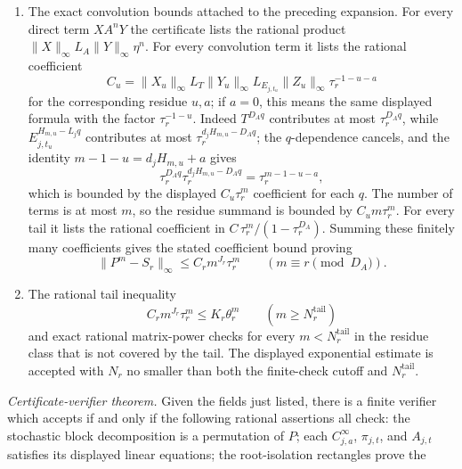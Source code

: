 \begin{theorem}
\begin{enumerate}[label=\textup{(\roman*)}]
    \(H_{m,u}-L_jq\ge1\); the finitely many smaller recurrent exponents
    are moved to the direct finite-check list. The resulting finite
    residue list is
    \[
      \sum_{q=0}^{Q(m,u)}
        X_{u}T^{D_Aq}Y_{u}E_{j,t_u}^{H_{m,u}-L_jq}Z_{u},
    \]
    with all matrices \(X_u,Y_u,Z_u\) rational. This is the normal form
    for every convolution term.
    \item The exact convolution bounds attached to the preceding
    expansion. For every direct term \(X A^nY\) the certificate lists
    the rational product
    \(\|X\|_\infty L_A\|Y\|_\infty\eta^n\). For every convolution term
    it lists the rational coefficient
    \[
      C_u=\|X_u\|_\infty L_T\|Y_u\|_\infty
        L_{E_{j,t_u}}\|Z_u\|_\infty\tau_r^{-1-u-a}
    \]
    for the corresponding residue \(u,a\); if \(a=0\), this means the
    same displayed formula with the factor \(\tau_r^{-1-u}\). Indeed
    \(T^{D_Aq}\) contributes at most \(\tau_r^{D_Aq}\), while
    \(E_{j,t_u}^{H_{m,u}-L_jq}\) contributes at most
    \(\tau_r^{d_jH_{m,u}-D_Aq}\); the \(q\)-dependence cancels, and the
    identity \(m-1-u=d_jH_{m,u}+a\) gives
    \[
      \tau_r^{D_Aq}\tau_r^{d_jH_{m,u}-D_Aq}
      =\tau_r^{m-1-u-a},
    \]
    which is bounded by the displayed \(C_u\tau_r^m\) coefficient for
    each \(q\). The number of terms is at most \(m\),
    so the residue summand is bounded by \(C_um\tau_r^m\). For every
    tail it lists the
    rational coefficient in
    \(C\,\tau_r^m/(1-\tau_r^{D_A})\). Summing these finitely many
    coefficients gives the stated coefficient bound
    proving
    \[
      \|P^m-S_r\|_\infty\le C_rm^{J_r}\tau_r^m
      \qquad(m\equiv r\pmod {D_A}).
    \]
    \item The rational tail inequality
    \[
      C_rm^{J_r}\tau_r^m\le K_r\theta_r^m
      \qquad(m\ge N_r^{\mathrm{tail}})
    \]
    and exact rational matrix-power checks for every
    \(m<N_r^{\mathrm{tail}}\) in the residue class that is not covered
    by the tail. The displayed exponential estimate is accepted with
    \(N_r\) no smaller than both the finite-check cutoff and
    \(N_r^{\mathrm{tail}}\).
  \end{enumerate}
  \smallskip
  \noindent\textit{Certificate-verifier theorem.}
  Given the fields just listed, there is a finite verifier which accepts
  if and only if the following rational assertions all check:
  the stochastic block decomposition is a permutation of \(P\); each
  \(C_{j,a}^{\infty}\), \(\pi_{j,t}\), and \(A_{j,t}\) satisfies its
  displayed linear equations; the root-isolation rectangles prove the

\end{theorem}
